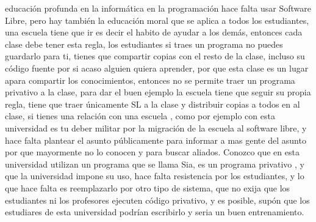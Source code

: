 \begin{multicols}{2}
  educación 
profunda en la informática en la programación hace falta usar Software Libre, pero hay también la educación moral que se aplica a todos los estudiantes, una escuela tiene que ir {\em {\color{introcolor}{ mas allá que ensańar hechos y capacidades tiene que ensańar el espíritu de buena voluntad, }}}es decir el habito de ayudar a los demás, entonces cada clase debe tener esta regla, los  estudiantes si traes un programa no puedes guardarlo para ti, tienes que compartir copias con el resto de la clase, incluso su código fuente por si acaso alguien quiera aprender, por que esta clase es un lugar apara compartir los conocimientos, entonces no se permite traer un programa privativo a la clase, para dar el buen ejemplo la escuela tiene que seguir su propia regla, tiene que traer únicamente SL a la clase y distribuir copias a todos en al clase, si tienes una relación con una escuela , como por ejemplo con esta universidad es tu deber militar  por la migración de la escuela al software libre, y hace falta plantear el asunto públicamente para informar a mas gente del asunto por que mayormente no lo conocen y para buscar aliados. Conozco que en esta universidad utilizan un programa que se llama Sia, es un programa privativo , y que la universidad impone su uso, hace falta resistencia por los estudiantes, y lo que hace falta es reemplazarlo por otro tipo de sistema, que no exija que los estudiantes ni los profesores ejecuten código privativo, y es posible, supón que los estudiares de esta universidad podrían escribirlo y seria un buen entrenamiento.




\end{multicols}
